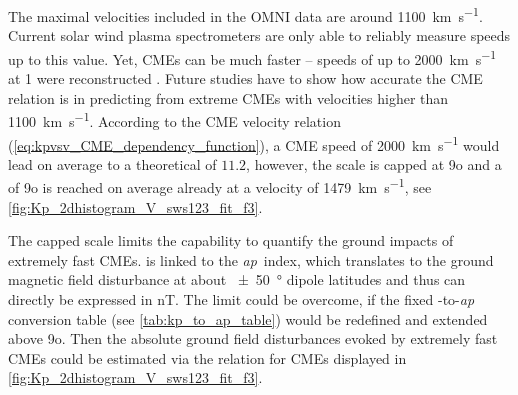 The maximal velocities included in the OMNI data are around \SI{1100}{\km\per\s}. Current solar wind plasma spectrometers are only able to reliably measure speeds up to this value. Yet, CMEs can be much faster -- speeds of up to \SI{2000}{\km\per\s} at \SI{1}{\au} were reconstructed \citep{Russell2013}. Future studies have to show how accurate the CME relation is in predicting \Kp{} from extreme CMEs with velocities higher than \SI{1100}{\km\per\s}. According to the CME velocity relation (\ref{eq:kpvsv_CME_dependency_function}), a CME speed of \SI{2000}{\km\per\s} would lead on average to a theoretical \Kp{} of $11.2$, however, the \Kp{} scale is capped at 9o and a \Kp{} of 9o is reached on average already at a velocity of \SI{1479}{\km\per\s}, see \autoref{fig:Kp_2dhistogram_V_sws123_fit_f3}.
\begin{figure}
\end{figure}

The capped \Kp{} scale limits the capability to quantify the ground impacts of extremely fast CMEs. \Kp{} is linked to the \textit{ap}~index, which translates to the ground magnetic field disturbance at about \SI{+-50}{\degree} dipole latitudes and thus can directly be expressed in \si{\nano\tesla}. The limit could be overcome, if the fixed \Kp-to-\textit{ap} conversion table (see \autoref{tab:kp_to_ap_table}) would be redefined and extended above \Kp{} 9o. Then the absolute ground field disturbances evoked by extremely fast CMEs could be estimated via the \Kp{} relation for CMEs displayed in \autoref{fig:Kp_2dhistogram_V_sws123_fit_f3}.

